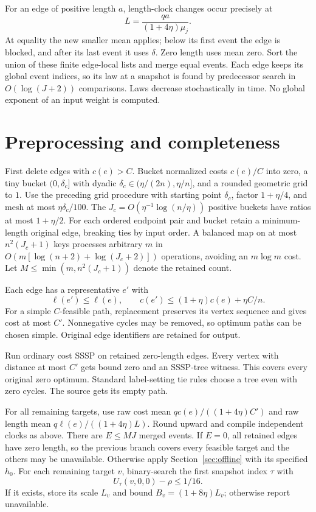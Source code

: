 \documentclass[acmsmall,11pt,screen,nonacm]{acmart}
\begin{document}
For an edge of positive length $a$, length-clock changes occur precisely at
\begin{equation}\label{eq:event}
 L=\frac{qa}{(1+4\eta)\mu_j}.
\end{equation}
At equality the new smaller mean applies; below its first event the edge is blocked, and after its last event it uses $\delta$. Zero length uses mean zero. Sort the union of these finite edge-local lists and merge equal events. Each edge keeps its global event indices, so its law at a snapshot is found by predecessor search in $O(\log(J+2))$ comparisons. Laws decrease stochastically in time. No global exponent of an input weight is computed.

\section{Preprocessing and completeness}\label{sec:complete}
First delete edges with $c(e)>C$. Bucket normalized costs $c(e)/C$ into zero, a tiny bucket $(0,\delta_c]$ with dyadic $\delta_c\in(\eta/(2n),\eta/n]$, and a rounded geometric grid to $1$. Use the preceding grid procedure with starting point $\delta_c$, factor $1+\eta/4$, and mesh at most $\eta\delta_c/100$. The $J_c=O(\eta^{-1}\log(n/\eta))$ positive buckets have ratios at most $1+\eta/2$. For each ordered endpoint pair and bucket retain a minimum-length original edge, breaking ties by input order. A balanced map on at most $n^2(J_c+1)$ keys processes arbitrary $m$ in $O(m[\log(n+2)+\log(J_c+2)])$ operations, avoiding an $m\log m$ cost. Let $M\le\min(m,n^2(J_c+1))$ denote the retained count.

Each edge has a representative $e'$ with
\begin{equation}\label{eq:compression}
 \ell(e')\le\ell(e),\qquad c(e')\le(1+\eta)c(e)+\eta C/n.
\end{equation}
For a simple $C$-feasible path, replacement preserves its vertex sequence and gives cost at most $C'$. Nonnegative cycles may be removed, so optimum paths can be chosen simple. Original edge identifiers are retained for output.

Run ordinary cost SSSP on retained zero-length edges. Every vertex with distance at most $C'$ gets bound zero and an SSSP-tree witness. This covers every original zero optimum. Standard label-setting tie rules choose a tree even with zero cycles. The source gets its empty path.

For all remaining targets, use raw cost mean $qc(e)/((1+4\eta)C')$ and raw length mean $q\ell(e)/((1+4\eta)L)$. Round upward and compile independent clocks as above. There are $E\le MJ$ merged events. If $E=0$, all retained edges have zero length, so the previous branch covers every feasible target and the others may be unavailable. Otherwise apply Section~\ref{sec:offline} with its specified $h_0$. For each remaining target $v$, binary-search the first snapshot index $\tau$ with
\begin{equation}\label{eq:accept}
 U_\tau(v,0,0)-\rho\le1/16.
\end{equation}
If it exists, store its scale $L_v$ and bound $B_v=(1+8\eta)L_v$; otherwise report unavailable.
\end{document}
